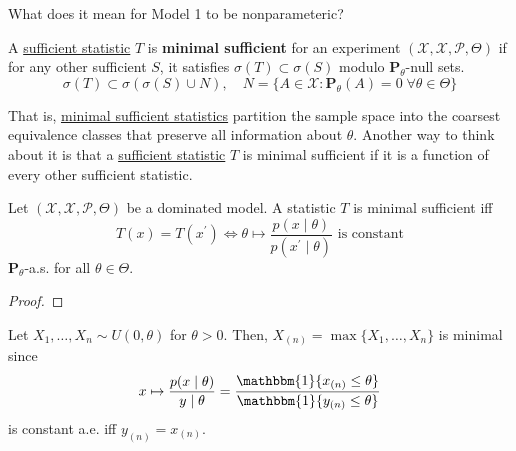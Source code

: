  \begin{question}
    What does it mean for Model 1 to be nonparameteric? 
  \end{question}

  \begin{definition}
    \label{def:minimal-sufficient-statistic}
    A \hyperref[def:sufficient-statistic]{sufficient statistic} $T$ is \textbf{minimal sufficient} for an experiment $(\mathcal{X}, \mathscr{X}, \mathcal{P}, \Theta)$ if for any other sufficient $S$, it satisfies $\sigma(T) \subset \sigma(S)$ modulo $\mathbf{P}_\theta$-null sets. 
    \begin{equation}
      \sigma(T) \subset \sigma(\sigma(S) \cup N), \quad N = \{A \in \mathscr{X} \colon \mathbf{P}_{\theta}(A) = 0 \; \forall \theta \in \Theta\} 
    \end{equation}
  \end{definition}

  That is, \hyperref[def:minimal-sufficient-statistic]{minimal sufficient statistics} partition the sample space into the coarsest equivalence classes that preserve all information about $\theta$. Another way to think about it is that a \hyperref[def:sufficient-statistic]{sufficient statistic} $T$ is minimal sufficient if it is a function of every other sufficient statistic. 

  \begin{theorem}
    \label{thm:minimal-sufficiency-in-a-dominated-model}
    Let $(\mathcal{X}, \mathscr{X}, \mathcal{P}, \Theta)$ be a dominated model. A statistic $T$ is minimal sufficient iff 
    \begin{equation}
      T(x) = T(x^\prime) \iff \theta \mapsto \frac{p(x \mid \theta)}{p(x^\prime \mid \theta)} \text{ is constant}
    \end{equation}
   $\mathbf{P}_{\theta}$-a.s. for all $\theta \in \Theta$. 
  \end{theorem}
  \begin{proof}
    
  \end{proof}

  \begin{example}
    \label{ex:minimal-sufficiency-for-uniform}
    Let $X_1, \ldots, X_n \sim U(0, \theta)$ for $\theta > 0$. Then, $X_{(n)} = \max\{X_1, \ldots, X_n\}$ is minimal since 
    \begin{equation}
      x \mapsto \frac{p(x \mid \theta)}{y \mid \theta} = \frac{\mathbbm{1}\{x_{(n)} \leq \theta\}}{ \mathbbm{1} \{y_{(n)} \leq \theta\} }
    \end{equation}
    is constant a.e. iff $y_{(n)} = x_{(n)}$. 
  \end{example}

